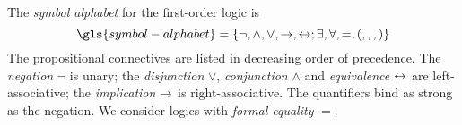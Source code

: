 
The \emph{symbol alphabet} for the first-order logic is
\[
  \gls{symbol-alphabet} = \set{\lnot, \allconns; \allQs,=,(,,,)}
\]
The propositional connectives are listed in decreasing order of precedence.
The \emph{negation} $\lnot$ is unary;
the \emph{disjunction} $\lor$, \emph{conjunction} $\land$ and \emph{equivalence}
$\leftrightarrow$ are left-associative; the \emph{implication} $\rightarrow$ is
right-associative. The quantifiers bind as strong as the negation.
We consider logics with \emph{formal equality} $=$.

